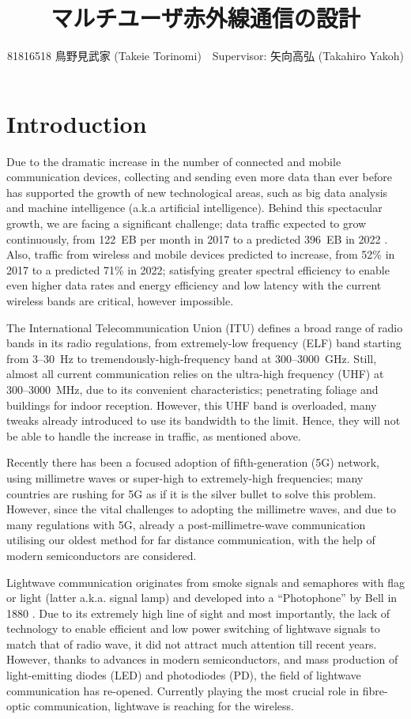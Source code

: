 ﻿\documentclass[twocolumn,9pt]{ltjsarticle}
\title{マルチユーザ赤外線通信の設計}
\author{81816518 鳥野見武家 (Takeie Torinomi)　Supervisor: 矢向高弘 (Takahiro Yakoh)}
\begin{document}
\maketitle
\section{Introduction}
Due to the dramatic increase in the number of connected and mobile communication devices, collecting and sending even more data than ever before has supported the growth of new technological areas, such as big data analysis and machine intelligence (a.k.a artificial intelligence).
Behind this spectacular growth, we are facing a significant challenge; data traffic expected to grow continuously, from \SI{122}{EB} per month in 2017 to a predicted \SI{396}{EB} in 2022 \cite{cisco}.
Also, traffic from wireless and mobile devices predicted to increase, from 52\% in 2017 to a predicted 71\% in 2022; satisfying greater spectral efficiency to enable even higher data rates and energy efficiency and low latency with the current wireless bands are critical, however impossible.

The International Telecommunication Union (ITU) defines a broad range of radio bands in its radio regulations,
from extremely-low frequency (ELF) band starting from 3--\SI{30}{Hz} to tremendously-high-frequency band at 300--\SI{3000}{GHz}.
Still, almost all current communication relies on the ultra-high frequency (UHF) at 300--\SI{3000}{MHz}, due to its convenient characteristics; penetrating foliage and buildings for indoor reception.
However, this UHF band is overloaded, many tweaks already introduced to use its bandwidth to the limit. 
Hence, they will not be able to handle the increase in traffic, as mentioned above.

Recently there has been a focused adoption of fifth-generation (5G) network, using millimetre waves or super-high to extremely-high frequencies; many countries are rushing for 5G as if it is the silver bullet to solve this problem.
However, since the vital challenges to adopting the millimetre waves, and due to many regulations with 5G, already a post-millimetre-wave communication utilising our oldest method for far distance communication, with the help of modern semiconductors are considered.

Lightwave communication originates from smoke signals and semaphores with flag or light (latter a.k.a. signal lamp) and developed into a ``Photophone'' by Bell in 1880 \cite{bell}.
Due to its extremely high line of sight and most importantly, the lack of technology to enable efficient and low power switching of lightwave signals to match that of radio wave, it did not attract much attention till recent years.
However, thanks to advances in modern semiconductors, and mass production of light-emitting diodes (LED) and photodiodes (PD), the field of lightwave communication has re-opened.
Currently playing the most crucial role in fibre-optic communication, lightwave is reaching for the wireless.
\end{document}
